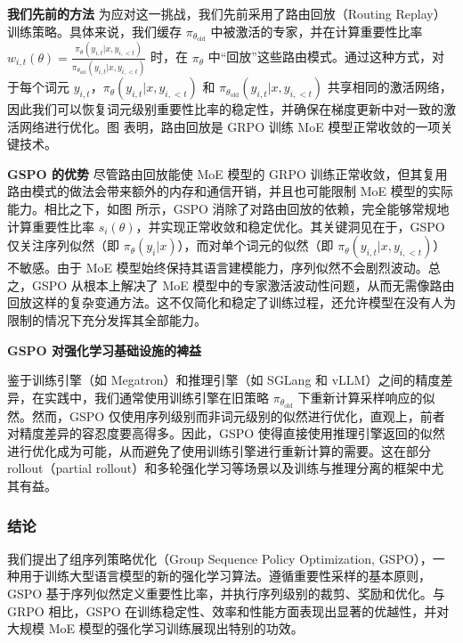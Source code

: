 \textbf{我们先前的方法} \quad 为应对这一挑战，我们先前采用了路由回放（Routing Replay）训练策略。具体来说，我们缓存 $\pi_{\theta_{\text{old}}}$ 中被激活的专家，并在计算重要性比率 $w_{i,t}(\theta) = \frac{\pi_\theta(y_{i,t}|x, y_{i,<t})}{\pi_{\theta_{\text{old}}}(y_{i,t}|x, y_{i,<t})}$ 时，在 $\pi_\theta$ 中“回放”这些路由模式。通过这种方式，对于每个词元 $y_{i,t}$，$\pi_\theta(y_{i,t}|x, y_{i,<t})$ 和 $\pi_{\theta_{\text{old}}}(y_{i,t}|x, y_{i,<t})$ 共享相同的激活网络，因此我们可以恢复词元级别重要性比率的稳定性，并确保在梯度更新中对一致的激活网络进行优化。图  表明，路由回放是 GRPO 训练 MoE 模型正常收敛的一项关键技术。

\textbf{GSPO 的优势} \quad 尽管路由回放能使 MoE 模型的 GRPO 训练正常收敛，但其复用路由模式的做法会带来额外的内存和通信开销，并且也可能限制 MoE 模型的实际能力。相比之下，如图  所示，GSPO 消除了对路由回放的依赖，完全能够常规地计算重要性比率 $s_i(\theta)$，并实现正常收敛和稳定优化。其关键洞见在于，GSPO 仅关注序列似然（即 $\pi_\theta(y_i|x)$），而对单个词元的似然（即 $\pi_\theta(y_{i,t}|x, y_{i,<t})$）不敏感。由于 MoE 模型始终保持其语言建模能力，序列似然不会剧烈波动。总之，GSPO 从根本上解决了 MoE 模型中的专家激活波动性问题，从而无需像路由回放这样的复杂变通方法。这不仅简化和稳定了训练过程，还允许模型在没有人为限制的情况下充分发挥其全部能力。

\textbf{GSPO 对强化学习基础设施的裨益}

鉴于训练引擎（如 Megatron）和推理引擎（如 SGLang 和 vLLM）之间的精度差异，在实践中，我们通常使用训练引擎在旧策略 $\pi_{\theta_{\text{old}}}$ 下重新计算采样响应的似然。然而，GSPO 仅使用序列级别而非词元级别的似然进行优化，直观上，前者对精度差异的容忍度要高得多。因此，GSPO 使得直接使用推理引擎返回的似然进行优化成为可能，从而避免了使用训练引擎进行重新计算的需要。这在部分 rollout（partial rollout）和多轮强化学习等场景以及训练与推理分离的框架中尤其有益。



\subsubsection{结论}
我们提出了组序列策略优化（Group Sequence Policy Optimization, GSPO），一种用于训练大型语言模型的新的强化学习算法。遵循重要性采样的基本原则，GSPO 基于序列似然定义重要性比率，并执行序列级别的裁剪、奖励和优化。与 GRPO 相比，GSPO 在训练稳定性、效率和性能方面表现出显著的优越性，并对大规模 MoE 模型的强化学习训练展现出特别的功效。

\begingroup
    \printbibliography[title={外文翻译参考文献}]
\endgroup
